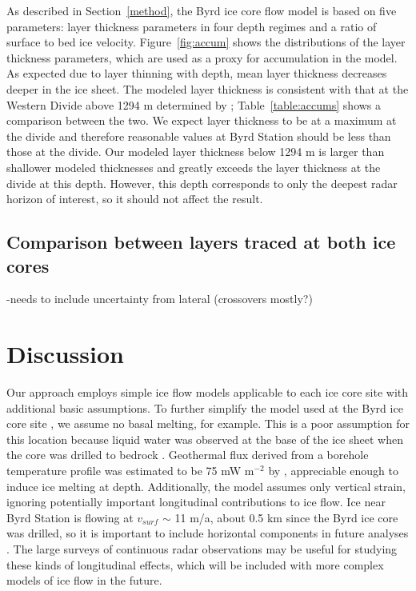 \documentclass[12pt]{article}
\begin{document}
As described in Section~\ref{method}, the Byrd ice core flow model is based on five parameters: layer thickness parameters in four depth regimes and a ratio of surface to bed ice velocity. Figure~\ref{fig:accum} shows the distributions of the layer thickness parameters, which are used as a proxy for accumulation in the model. As expected due to layer thinning with depth, mean layer thickness decreases deeper in the ice sheet. The modeled layer thickness is consistent with that at the Western Divide above 1294 m determined by \citep{neumann2008}; Table~\ref{table:accums} shows a comparison between the two. We expect layer thickness to be at a maximum at the divide and therefore reasonable values at Byrd Station should be less than those at the divide. Our modeled layer thickness below 1294 m is larger than shallower modeled thicknesses and greatly exceeds the layer thickness at the divide at this depth. However, this depth corresponds to only the deepest radar horizon of interest, so it should not affect the result.

\subsection{Comparison between layers traced at both ice cores}
-needs to include uncertainty from lateral (crossovers mostly?)


\section{Discussion}

Our approach employs simple ice flow models applicable to each ice core site with additional basic assumptions.  To further simplify the model used at the Byrd ice core site \citep{morland2009}, we assume no basal melting, for example. This is a poor assumption for this location because liquid water was observed at the base of the ice sheet when the core was drilled to bedrock \citep{gow1968}. Geothermal flux derived from a borehole temperature profile was estimated to be 75 mW m$^{-2}$ by \citet{gow1968}, appreciable enough to induce ice melting at depth. Additionally, the model assumes only vertical strain, ignoring potentially important longitudinal contributions to ice flow. Ice near Byrd Station is flowing at $v_{surf}$ $\sim$ 11 m/a, about 0.5 km since the Byrd ice core was drilled, so it is important to include horizontal components in future analyses \citep{bindschadler1997}. The large surveys of continuous radar observations may be useful for studying these kinds of longitudinal effects, which will be included with more complex models of ice flow in the future.
\end{document}
